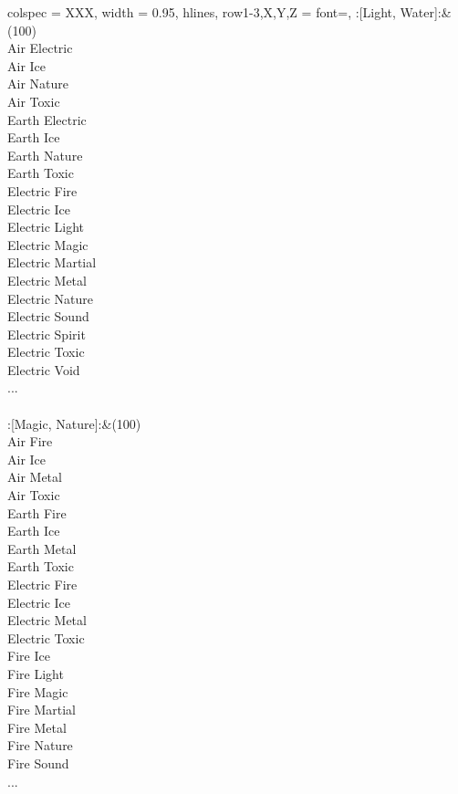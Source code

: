 \begin{longtblr}[
	caption = {2v2 Defending Weak},
	label = {2v2-Defending-Weak},
]{
	colspec = {XXX}, width = 0.95\linewidth,
	hlines,
	row{1-3,X,Y,Z} = {font=\bfseries},
}
	:[Light, Water]:&{(100)\\
	Air Electric \\
	Air Ice \\
	Air Nature \\
	Air Toxic \\
	Earth Electric \\
	Earth Ice \\
	Earth Nature \\
	Earth Toxic \\
	Electric Fire \\
	Electric Ice \\
	Electric Light \\
	Electric Magic \\
	Electric Martial \\
	Electric Metal \\
	Electric Nature \\
	Electric Sound \\
	Electric Spirit \\
	Electric Toxic \\
	Electric Void \\
	...\\
	}\\

	:[Magic, Nature]:&{(100)\\
	Air Fire \\
	Air Ice \\
	Air Metal \\
	Air Toxic \\
	Earth Fire \\
	Earth Ice \\
	Earth Metal \\
	Earth Toxic \\
	Electric Fire \\
	Electric Ice \\
	Electric Metal \\
	Electric Toxic \\
	Fire Ice \\
	Fire Light \\
	Fire Magic \\
	Fire Martial \\
	Fire Metal \\
	Fire Nature \\
	Fire Sound \\
	...\\
	}\\


\end{longtblr}
